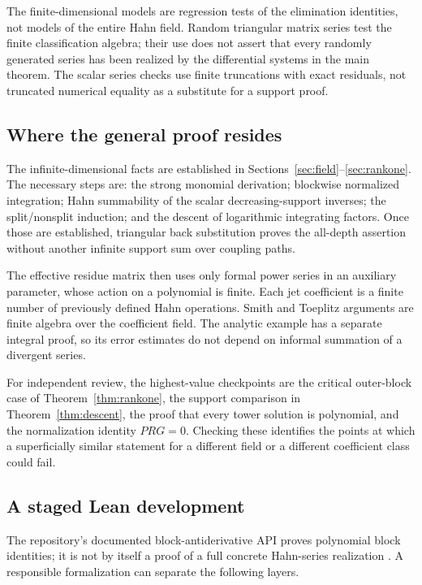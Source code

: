 \documentclass[11pt,a4paper]{article}
\numberwithin{equation}{section}
\theoremstyle{definition}
\theoremstyle{remark}\newtheorem{remark}[theorem]{Remark}
\begin{document}
The finite-dimensional models are regression tests of the elimination identities, not models of the entire Hahn field. Random triangular matrix series test the finite classification algebra; their use does not assert that every randomly generated series has been realized by the differential systems in the main theorem. The scalar series checks use finite truncations with exact residuals, not truncated numerical equality as a substitute for a support proof.

\subsection{Where the general proof resides}
The infinite-dimensional facts are established in Sections~\ref{sec:field}--\ref{sec:rankone}. The necessary steps are: the strong monomial derivation; blockwise normalized integration; Hahn summability of the scalar decreasing-support inverses; the split/nonsplit induction; and the descent of logarithmic integrating factors. Once those are established, triangular back substitution proves the all-depth assertion without another infinite support sum over coupling paths.

The effective residue matrix then uses only formal power series in an auxiliary parameter, whose action on a polynomial is finite. Each jet coefficient is a finite number of previously defined Hahn operations. Smith and Toeplitz arguments are finite algebra over the coefficient field. The analytic example has a separate integral proof, so its error estimates do not depend on informal summation of a divergent series.

For independent review, the highest-value checkpoints are the critical outer-block case of Theorem~\ref{thm:rankone}, the support comparison in Theorem~\ref{thm:descent}, the proof that every tower solution is polynomial, and the normalization identity $PRG=0$. Checking these identifies the points at which a superficially similar statement for a different field or a different coefficient class could fail.

\subsection{A staged Lean development}
The repository's documented block-antiderivative API proves polynomial block identities; it is not by itself a proof of a full concrete Hahn-series realization \cite{repo-volume}. A responsible formalization can separate the following layers.
\end{document}
